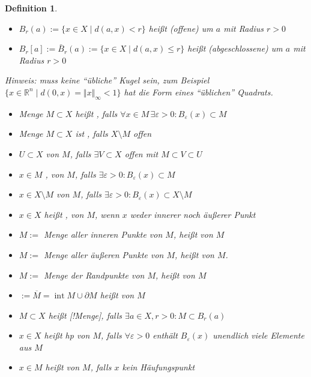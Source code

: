 \documentclass[ngerman,a4paper]{report}
\theoremstyle{break}
\newtheorem*{definition}{Definition}
\renewcommand{\epsilon}{\varepsilon}
\DeclareMathOperator{\Int}{int}
\DeclareMathOperator{\Ext}{ext}
\DeclareMathOperator{\cl}{cl}
\begin{document}
\begin{definition}
    \begin{itemize}
    \item $B_r(a):=\{ x\in X \mid d(a,x) < r \}$ heißt (offene) um $a$ mit Radius $r > 0$
    \item $B_r[a]:=\bar{B}_r(a):=\{ x\in X \mid d(a,x) \le r \}$ heißt (abgeschlossene) um $a$ mit Radius $r > 0$
    \end{itemize}
    Hinweis: muss keine "`übliche"' Kugel sein, zum Beispiel $\{ x\in \mathbb{R}^n \mid d(0,x) = \Vert x\Vert_{\infty} < 1 \}$ hat die Form eines "`üblichen"' Quadrats.
    \begin{itemize}
        \item Menge $M\subset X$ heißt , falls $\forall x\in M\,\exists \epsilon > 0: B_\epsilon(x) \subset M$
        \item Menge $M\subset X$ ist , falls $X\setminus M$ offen
        \item $U\subset X$  von $M$, falls $\exists V\subset X$ offen mit $M\subset V\subset U$
        \item $x\in M$ , von $M$, falls $\exists \epsilon > 0: B_\epsilon(x)\subset M$
        \item $x\in X\setminus M$  von $M$, falls $\exists \epsilon > 0: B_\epsilon(x)\subset X\setminus M$
        \item $x\in X$ heißt , von $M$, wenn $x$ weder innerer noch äußerer Punkt
        \item \mathsymbol{int}{$\Int$}$ M:=$ Menge aller inneren Punkte von $M$, heißt  von $M$
        \item \mathsymbol{ext}{$\Ext$}$M:=$ Menge aller äußeren Punkte von $M$, heißt  von $M$.
        \item {}$M:=$ Menge der Randpunkte von $M$, heißt  von $M$
        \item \mathsymbol{cl}{$\cl$}$:=\overline{M} = \Int M \cup \partial M$ heißt  von $M$
        \item $M\subset X$ heißt [!Menge], falls $\exists a\in X, r>0: M\subset B_r(a)$
        \item $x\in X$ heißt \gls{hp} von $M$, falls $\forall \epsilon > 0$ enthält $B_\epsilon(x)$ unendlich viele Elemente aus $M$
        \item $x\in M$ heißt  von $M$, falls $x$ kein Häufungspunkt
        \end{itemize}
\end{definition}
\end{document}
